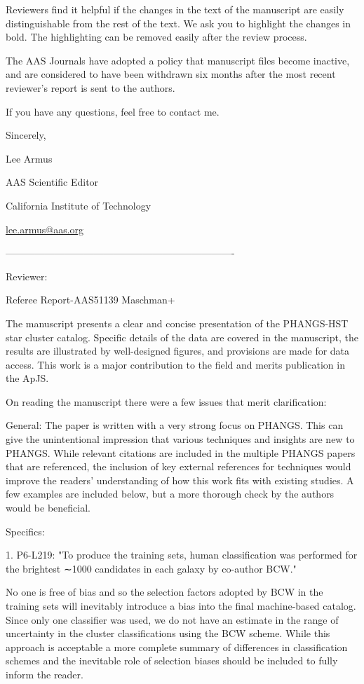 Reviewers find it helpful if the changes in the text of the manuscript are easily distinguishable from the rest of the text. We ask you to highlight the changes in bold. The highlighting can be removed easily after the review process.

The AAS Journals have adopted a policy that manuscript files become inactive, and are considered to have been withdrawn six months after the most recent reviewer's report is sent to the authors.

If you have any questions, feel free to contact me.

Sincerely,

Lee Armus

AAS Scientific Editor

California Institute of Technology

\href{mailto:lee.armus@aas.org}{lee.armus@aas.org}

----------------------------------------------------------------------

Reviewer:

Referee Report-AAS51139 Maschman+

The manuscript presents a clear and concise presentation of the PHANGS-HST star cluster catalog. Specific details of the data are covered in the manuscript, the results are illustrated by well-designed figures, and provisions are made for data access. This work is a major contribution to the field and merits publication in the ApJS.

On reading the manuscript there were a few issues that merit clarification:

General: The paper is written with a very strong focus on PHANGS. This can give the unintentional impression that various techniques and insights are new to PHANGS. While relevant citations are included in the multiple PHANGS papers that are referenced, the inclusion of key external references for techniques would improve the readers' understanding of how this work fits with existing studies. A few examples are included below, but a more thorough check by the authors would be beneficial.

Specifics:

1. P6-L219: "To produce the training sets, human classification was performed for the brightest ∼1000 candidates in each galaxy by co-author BCW."

No one is free of bias and so the selection factors adopted by BCW in the training sets will inevitably introduce a bias into the final machine-based catalog. Since only one classifier was used, we do not have an estimate in the range of uncertainty in the cluster classifications using the BCW scheme. While this approach is acceptable a more complete summary of differences in classification schemes and the inevitable role of selection biases should be included to fully inform the reader.

